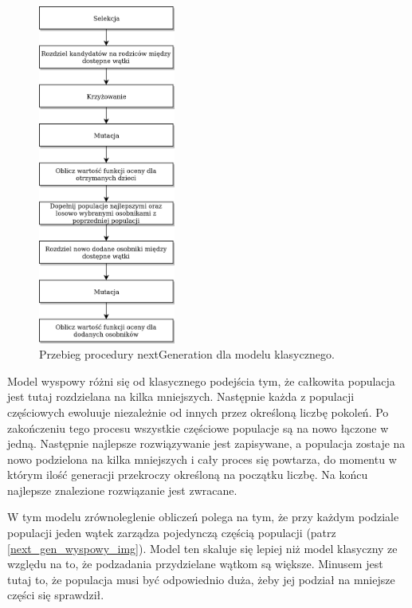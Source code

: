 \begin{figure}[H]
    \centering        
    \includegraphics[width=0.4\textwidth]{img/next_gen_klasyczny.png}
    \caption{Przebieg procedury nextGeneration dla modelu klasycznego.}
    \label{next_gen_klasyczny_img}
\end{figure}

Model wyspowy różni się od klasycznego podejścia tym, że całkowita populacja jest tutaj rozdzielana na kilka mniejszych. Następnie każda z 
populacji częściowych ewoluuje niezależnie od innych przez określoną liczbę pokoleń. Po zakończeniu tego procesu wszystkie częściowe populacje 
są na nowo łączone w jedną. Następnie najlepsze rozwiązywanie jest zapisywane, a populacja zostaje na nowo podzielona na kilka mniejszych i 
cały proces się powtarza, do momentu w którym ilość generacji przekroczy określoną na początku liczbę. Na końcu najlepsze znalezione rozwiązanie 
jest zwracane.

W tym modelu zrównoleglenie obliczeń polega na tym, że przy każdym podziale populacji jeden wątek zarządza pojedynczą częścią populacji (patrz \ref{next_gen_wyspowy_img}).
Model ten skaluje się lepiej niż model klasyczny ze względu na to, że podzadania przydzielane wątkom są większe. Minusem jest tutaj to, że populacja 
musi być odpowiednio duża, żeby jej podział na mniejsze części się sprawdził.

